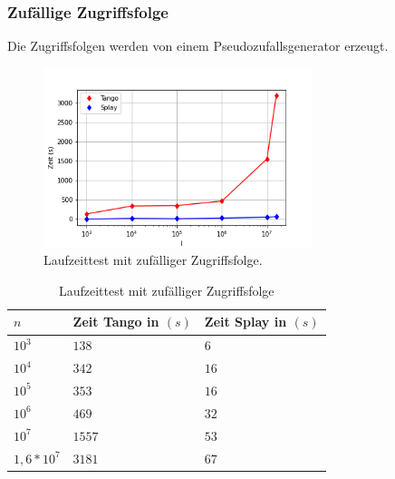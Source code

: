 \documentclass[a4paper,12pt]{article}
\begin{document}
\subsubsection{Zufällige Zugriffsfolge}
Die Zugriffsfolgen werden von einem Pseudozufallsgenerator erzeugt. 
\begin{figure}[H]
	\centering
	\includegraphics[width=0.7\textwidth]{"Medien/laufzeittest/diagramm/randomaccess"}
	\caption{Laufzeittest mit zufälliger Zugriffsfolge.}

\end{figure}
  \begin{table}[H]
	\begin{center}
		\begin{tabular}[c]{|l|l|l|}
			\hline
			$n$ & Zeit Tango in $\left(s\right)$ &Zeit Splay in $\left(s\right)$ \\
			\hline
			$10^3$ & $138$ &$6$ \\
			\hline
			$10^4$  & $342$ &$16$  \\
			\hline
			$10^5$  & $353$ &$16$  \\
			\hline
			$10^6$  & $469$ &$32$  \\
			\hline
			$10^7$  & $1557$ &$53$  \\
			\hline
			$1,6 *10^7$  & $3181$ &$67$  \\
			\hline
		\end{tabular}
		\caption{Laufzeittest mit zufälliger Zugriffsfolge} 
	\end{center}
\end{table}
\end{document}
